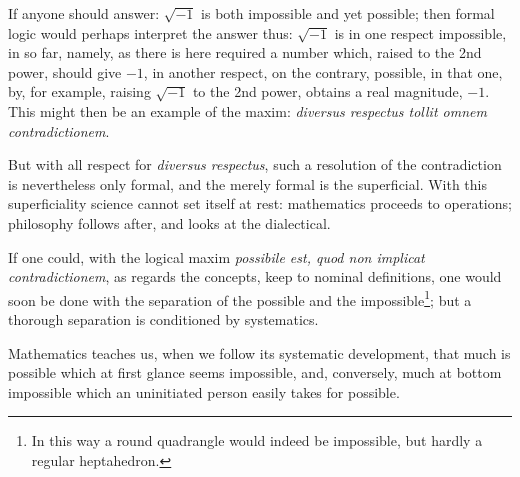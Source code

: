 \documentclass[12pt]{book}
\begin{document}
If anyone should answer: $\sqrt{-1}$ is both impossible and yet possible; then formal
logic would perhaps interpret the answer thus: $\sqrt{-1}$ is in one respect
impossible, in so far, namely, as there is here required a number which, raised to
the 2nd power, should give $-1$, in another respect, on the contrary, possible, in
that one, by, for example, raising $\sqrt{-1}$ to the 2nd power, obtains a real
magnitude, $-1$. This might then be an example of the maxim: \textit{diversus
respectus tollit omnem contradictionem}.

But with all respect for \textit{diversus respectus}, such a resolution of the
contradiction is nevertheless only formal, and the merely formal is the superficial.
With this superficiality science cannot set itself at rest: mathematics proceeds to
operations; philosophy follows after, and looks at the dialectical.

If one could, with the logical maxim \textit{possibile est, quod non implicat
contradictionem}, as regards the concepts, keep to nominal definitions, one would
soon be done with the separation of the possible and the impossible\footnote{In this
way a round quadrangle would indeed be impossible, but hardly a regular
heptahedron.}; but a thorough separation is conditioned by systematics.

Mathematics teaches us, when we follow its systematic development, that much is
possible which at first glance seems impossible, and, conversely, much at bottom
impossible which an uninitiated person easily takes for possible.
\end{document}
